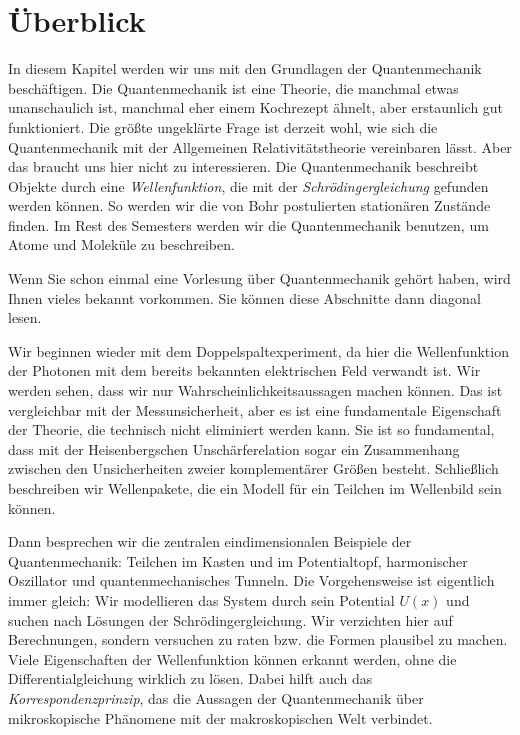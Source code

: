 


\section{Überblick}

In diesem Kapitel werden wir uns mit den Grundlagen der Quantenmechanik beschäftigen. Die Quantenmechanik ist eine Theorie, die manchmal etwas unanschaulich ist, manchmal eher einem Kochrezept ähnelt, aber erstaunlich gut funktioniert. Die größte ungeklärte Frage ist derzeit wohl, wie sich die Quantenmechanik mit der Allgemeinen Relativitätstheorie vereinbaren lässt. Aber das braucht uns hier nicht zu interessieren. Die Quantenmechanik beschreibt Objekte durch eine \emph{Wellenfunktion},  die mit der \emph{Schrödingergleichung} gefunden werden können.  So werden wir die von Bohr postulierten stationären Zustände finden. Im Rest des Semesters werden wir die Quantenmechanik benutzen, um Atome und Moleküle zu beschreiben.

Wenn Sie schon einmal eine Vorlesung über Quantenmechanik gehört haben, wird Ihnen vieles bekannt vorkommen. Sie können diese Abschnitte dann diagonal lesen.

Wir beginnen wieder mit dem Doppelspaltexperiment, da hier die Wellenfunktion der Photonen mit dem bereits bekannten elektrischen Feld verwandt ist. Wir werden sehen, dass wir nur Wahrscheinlichkeitsaussagen machen können. Das ist vergleichbar mit der Messunsicherheit, aber es ist eine fundamentale Eigenschaft der Theorie, die technisch nicht eliminiert werden kann. Sie ist so fundamental, dass mit der Heisenbergschen Unschärferelation sogar ein Zusammenhang zwischen den Unsicherheiten zweier komplementärer Größen besteht. Schließlich beschreiben wir Wellenpakete, die ein Modell für ein Teilchen im Wellenbild sein können.

Dann besprechen wir die zentralen eindimensionalen Beispiele der Quantenmechanik: Teilchen im Kasten und im Potentialtopf, harmonischer Oszillator und quantenmechanisches Tunneln. Die Vorgehensweise ist eigentlich immer gleich: Wir modellieren das System durch sein Potential $U(x)$ und suchen nach Lösungen der Schrödingergleichung. Wir verzichten hier auf Berechnungen, sondern versuchen zu raten bzw. die Formen plausibel zu machen. Viele Eigenschaften der Wellenfunktion können erkannt werden, ohne die Differentialgleichung wirklich zu lösen. Dabei hilft auch das \emph{Korrespondenzprinzip}, das die Aussagen der Quantenmechanik über mikroskopische Phänomene mit der makroskopischen Welt verbindet.



